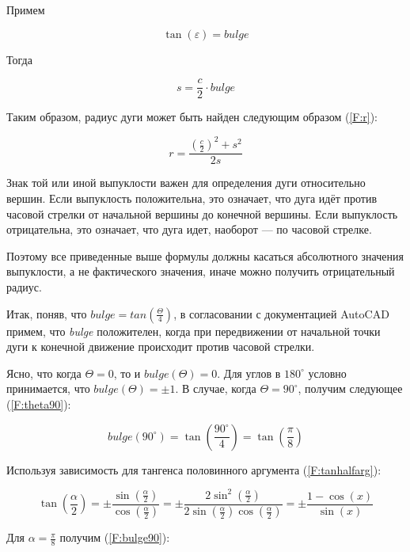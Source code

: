 Примем

\begin{equation}
	\tan(\varepsilon)=bulge
	\label{F:tanepsilon}
\end{equation}

Тогда

\begin{equation}
	s=\frac{c}{2}\cdot bulge
	\label{F:sfinal}
\end{equation}

Таким образом, радиус дуги может быть найден следующим образом (\ref{F:r}):

\begin{equation}
	r=\frac{(\frac{c}{2})^2+s^2}{2s}
	\label{F:r}
\end{equation}

Знак той или иной выпуклости важен для определения дуги относительно вершин. Если выпуклость положительна, это означает, что дуга идёт против часовой стрелки от начальной вершины до конечной вершины. Если выпуклость отрицательна, это означает, что дуга идет, наоборот --- по часовой стрелке.

Поэтому все приведенные выше формулы должны касаться абсолютного значения выпуклости, а не фактического значения, иначе можно получить отрицательный радиус.

Итак, поняв, что $bulge = tan(\frac{\Theta}{4})$, в согласовании с документацией AutoCAD \cite{Autodesk} примем, что \textit{bulge} положителен, когда при передвижении от начальной точки дуги к конечной движение происходит против часовой стрелки.

Ясно, что когда $\Theta=0$, то и $bulge(\Theta)=0$. Для углов в $180^{\circ}$ условно принимается, что $bulge(\Theta)=\pm1$. В случае, когда $\Theta=90^{\circ}$, получим следующее (\ref{F:theta90}):

\begin{equation}
	bulge(90^{\circ})= \tan(\frac{90^{\circ}}{4})=\tan(\frac{\pi}{8})
	\label{F:theta90}
\end{equation}

Используя зависимость для тангенса половинного аргумента (\ref{F:tanhalfarg}):

\begin{equation}
	\tan(\frac{\alpha}{2})=\pm\frac{\sin(\frac{\alpha}{2})}{\cos(\frac{\alpha}{2})}=\pm\frac{2\sin^2(\frac{\alpha}{2})}{2\sin(\frac{\alpha}{2})\cos(\frac{\alpha}{2})}=\pm\frac{1-\cos(x)}{\sin(x)}
	\label{F:tanhalfarg}
\end{equation}

Для $\alpha=\frac{\pi}{8}$ получим (\ref{F:bulge90}):

